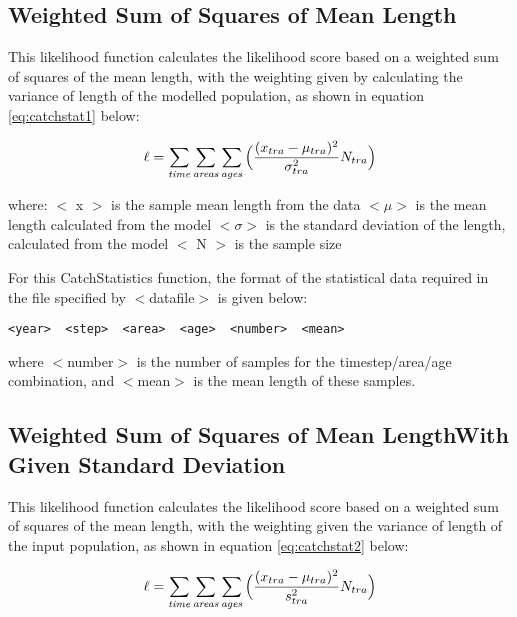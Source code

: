 \documentclass[]{book}
\begin{document}
\hypertarget{weighted-sum-of-squares-of-mean-length}{%
\subsection{Weighted Sum of Squares of Mean Length}\label{weighted-sum-of-squares-of-mean-length}}

This likelihood function calculates the likelihood score based on a
weighted sum of squares of the mean length, with the weighting given by
calculating the variance of length of the modelled population, as shown
in equation \eqref{eq:catchstat1} below:

\begin{equation}
\label{eq:catchstat1}
\ell = \sum_{\it time}\sum_{\it areas}\sum_{\it ages} \Big(\frac{(x_{tra}-\mu_{tra})^2} {\sigma_{tra}^2} N_{tra}\Big)\end{equation}

where: \(<\) x \(>\) is the sample mean length from the data \(<\mu>\) is the
mean length calculated from the model \(<\sigma>\) is the standard
deviation of the length, calculated from the model \(<\) N \(>\) is the
sample size

For this CatchStatistics function, the format of the statistical data
required in the file specified by \(<\)datafile\(>\) is given below:

\begin{verbatim}
<year>  <step>  <area>  <age>  <number>  <mean>
\end{verbatim}

where \(<\)number\(>\) is the number of samples for the timestep/area/age
combination, and \(<\)mean\(>\) is the mean length of these samples.

\hypertarget{weighted-sum-of-squares-of-mean-lengthwith-given-standard-deviation}{%
\subsection{Weighted Sum of Squares of Mean LengthWith Given Standard Deviation}\label{weighted-sum-of-squares-of-mean-lengthwith-given-standard-deviation}}

This likelihood function calculates the likelihood score based on a
weighted sum of squares of the mean length, with the weighting given the
variance of length of the input population, as shown in
equation \eqref{eq:catchstat2} below:

\begin{equation}
\label{eq:catchstat2}
\ell = \sum_{\it time}\sum_{\it areas}\sum_{\it ages} \Big(\frac{(x_{tra}-\mu_{tra})^2} {s_{tra}^2} N_{tra}\Big)\end{equation}
\end{document}
